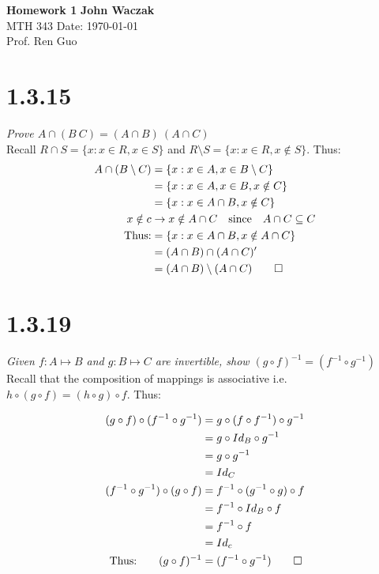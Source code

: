 \documentclass[a4paper, 11pt]{article}
\begin{document}
\noindent
\large\textbf{Homework 1} \hfill \textbf{John Waczak} \\
\normalsize MTH 343 \hfill  Date: \today \\
Prof. Ren Guo  \\


\section*{1.3.15}
\textit{Prove $A \cap (B \ C) = (A \cap B) \ (A \cap C)$}\\

Recall $R \cap S = \{x : x \in R, x \in S\}$ and $R\setminus S = \{x:x\in R, x \notin S\}$. Thus: 
\begin{align*}
	A \cap (B \setminus C) &= \{x:x \in A, x \in B \setminus C \} \\ 
	&= \{x: x \in A, x \in B, x \notin C \}  \\ 
	&= \{x: x \in A \cap B, x \notin C \} \\ 
	x \notin c &\rightarrow x \notin A \cap C \quad \mbox{since} \quad A \cap C \subseteq C \\
	\mbox{Thus:} &= \{x:x \in A \cap B , x \notin A \cap C\} \\
	&= (A \cap B) \cap (A \cap C)' \\ 
	&= (A \cap B) \setminus (A \cap C) \qed
\end{align*}

\section*{1.3.19}
\textit{Given $f:A \mapsto B$ and $g:B \mapsto C$ are invertible, show $(g \circ f)^{-1} = (f^{-1} \circ g^{-1})$} \\


Recall that the composition of mappings is associative i.e. $h \circ (g \circ f) = (h \circ g) \circ f$. Thus: 

\begin{align*}
	(g \circ f) \circ (f^{-1} \circ g^{-1}) &= g \circ (f \circ f^{-1}) \circ g^{-1} \\ 
	&= g \circ Id_B \circ g^{-1} \\ 
	&= g \circ g^{-1} \\ 
	&= Id_C \\
	(f^{-1} \circ g^{-1}) \circ (g \circ f) &= f^{-1} \circ (g^{-1} \circ g) \circ f \\ 
	&= f^{-1} \circ Id_B \circ f \\ 
	&= f^{-1} \circ f \\ 
	&= Id_c \\ 
	\mbox{Thus:} \quad \quad (g \circ f)^{-1} &= (f^{-1} \circ g^{-1}) \qed
\end{align*}
\end{document}
